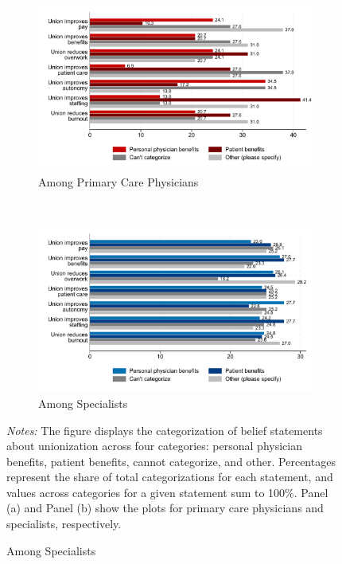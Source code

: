 \documentclass[11pt]{article}
\theoremstyle{definition}
\begin{document}
\begin{figure}[H]
    \centering
    \caption{Categorization of Belief Questions by Physician Type}
       \begin{subfigure}{0.8\textwidth}
        \caption{Among Primary Care Physicians}
    \begin{adjustbox}{width=1\linewidth}  
    \includegraphics[width=1\linewidth]{Pre-Survey/figures/cat_statements_outtype_PC.pdf}
\end{adjustbox}
    \end{subfigure}
    \\
        \begin{subfigure}{0.8\textwidth}
        \caption{Among Specialists}
    \begin{adjustbox}{width=1\linewidth}  
    \includegraphics[width=1\linewidth]{Pre-Survey/figures/cat_statements_outtype_SP.pdf}
\end{adjustbox}
    \end{subfigure}
    \label{fig:distributed}
     {\parbox{\linewidth}{           %
		\scriptsize{{{ \textit{Notes:} The figure displays the categorization of belief statements about unionization across four categories: personal physician benefits, patient benefits, cannot categorize, and other. Percentages represent the share of total categorizations for each statement, and values across categories for a given statement sum to 100\%. Panel (a) and Panel (b) show the plots for primary care physicians and specialists, respectively.}}}}}
\end{figure}
\end{document}
